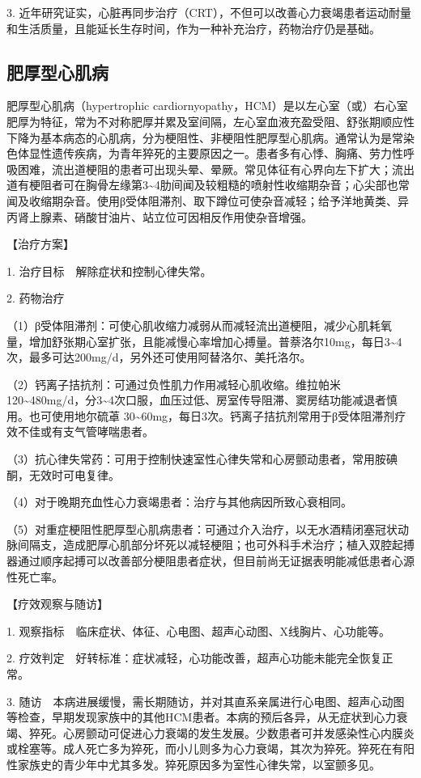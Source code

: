 3.
近年研究证实，心脏再同步治疗（CRT），不但可以改善心力衰竭患者运动耐量和生活质量，且能延长生存时间，作为一种补充治疗，药物治疗仍是基础。

\subsection{肥厚型心肌病}

肥厚型心肌病（hypertrophic
cardiornyopathy，HCM）是以左心室（或）右心室肥厚为特征，常为不对称肥厚并累及室间隔，左心室血液充盈受阻、舒张期顺应性下降为基本病态的心肌病，分为梗阻性、非梗阻性肥厚型心肌病。通常认为是常染色体显性遗传疾病，为青年猝死的主要原因之一。患者多有心悸、胸痛、劳力性呼吸困难，流出道梗阻的患者可出现头晕、晕厥。常见体征有心界向左下扩大；流出道有梗阻者可在胸骨左缘第3\textasciitilde{}4肋间闻及较粗糙的喷射性收缩期杂音；心尖部也常闻及收缩期杂音。使用β受体阻滞剂、取下蹲位可使杂音减轻；给予洋地黄类、异丙肾上腺素、硝酸甘油片、站立位可因相反作用使杂音增强。

【治疗方案】

1. 治疗目标　解除症状和控制心律失常。

2. 药物治疗

（1）β受体阻滞剂：可使心肌收缩力减弱从而减轻流出道梗阻，减少心肌耗氧量，增加舒张期心室扩张，且能减慢心率增加心搏量。普萘洛尔10mg，每日3\textasciitilde{}4次，最多可达200mg/d，另外还可使用阿替洛尔、美托洛尔。

（2）钙离子拮抗剂：可通过负性肌力作用减轻心肌收缩。维拉帕米120\textasciitilde{}480mg/d，分3\textasciitilde{}4次口服，血压过低、房室传导阻滞、窦房结功能减退者慎用。也可使用地尔硫䓬
30\textasciitilde{}60mg，每日3次。钙离子拮抗剂常用于β受体阻滞剂疗效不佳或有支气管哮喘患者。

（3）抗心律失常药：可用于控制快速室性心律失常和心房颤动患者，常用胺碘酮，无效时可电复律。

（4）对于晚期充血性心力衰竭患者：治疗与其他病因所致心衰相同。

（5）对重症梗阻性肥厚型心肌病患者：可通过介入治疗，以无水酒精闭塞冠状动脉间隔支，造成肥厚心肌部分坏死以减轻梗阻；也可外科手术治疗；植入双腔起搏器通过顺序起搏可以改善部分梗阻患者症状，但目前尚无证据表明能减低患者心源性死亡率。

【疗效观察与随访】

1. 观察指标　临床症状、体征、心电图、超声心动图、X线胸片、心功能等。

2.
疗效判定　好转标准：症状减轻，心功能改善，超声心功能未能完全恢复正常。

3.
随访　本病进展缓慢，需长期随访，并对其直系亲属进行心电图、超声心动图等检查，早期发现家族中的其他HCM患者。本病的预后各异，从无症状到心力衰竭、猝死。心房颤动可促进心力衰竭的发生发展。少数患者可并发感染性心内膜炎或栓塞等。成人死亡多为猝死，而小儿则多为心力衰竭，其次为猝死。猝死在有阳性家族史的青少年中尤其多发。猝死原因多为室性心律失常，以室颤多见。

